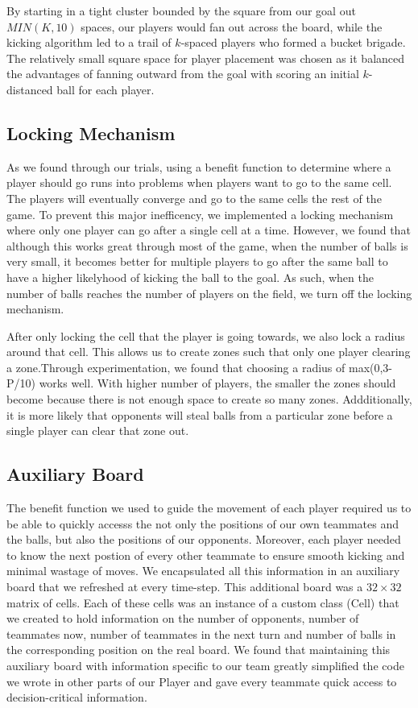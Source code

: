 \documentclass[
10pt, %
letterpaper, %
oneside, %
headinclude,footinclude, %
english
]{article}
\begin{document}
By starting in a tight cluster bounded by the square from our goal out $MIN(K,10)$ spaces, our players would fan out across the board, while the kicking algorithm led to a trail of $k$-spaced players who formed a bucket brigade. The relatively small square space for player placement was chosen as it balanced the advantages of fanning outward from the goal with scoring an initial $k$-distanced ball for each player.

\subsection{Locking Mechanism}
As we found through our trials, using a benefit function to determine where a player should go runs into problems when players want to go to the same cell. The players will eventually converge and go to the same cells the rest of the game. To prevent this major inefficency, we implemented a locking mechanism where only one player can go after a single cell at a time. However, we found that although this works great through most of the game, when the number of balls is very small, it becomes better for multiple players to go after the same ball to have a higher likelyhood of kicking the ball to the goal. As such, when the number of balls reaches the number of players on the field, we turn off the locking mechanism.

After only locking the cell that the player is going towards, we also lock a radius around that cell. This allows us to create zones such that only one player clearing a zone.Through experimentation, we found that choosing a radius of max(0,3-P/10) works well. With higher number of players, the smaller the zones should become because there is not enough space to create so many zones. Addditionally, it is more likely that opponents will steal balls from a particular zone before a single player can clear that zone out.

\subsection {Auxiliary Board}
The benefit function we used to guide the movement of each player required us to be able to quickly accesss the not only the positions of our own teammates and the balls, but also the positions of our opponents. Moreover, each player needed to know the next postion of every other teammate to ensure smooth kicking and minimal wastage of moves. We encapsulated all this information in an auxiliary board that we refreshed at every time-step. This additional board was a $32 \times 32$ matrix of cells. Each of these cells was an instance of a custom class (Cell) that we created to hold information on the number of opponents, number of teammates now, number of teammates in the next turn and number of balls in the corresponding position on the real board. We found that maintaining this auxiliary board with information specific to our team greatly simplified the code we wrote in other parts of our Player and gave every teammate quick access to decision-critical information. 
\end{document}
